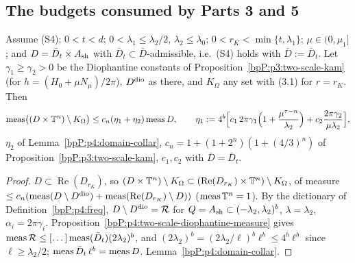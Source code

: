\subsection{The budgets consumed by Parts 3 and 5}\label{bpP:p4:s-budget}

\begin{proposition}\label{bpP:p4:budget}
Assume (S4); $0<t<d$; $0<\lambda_1\le\lambda_2/2$, $\lambda_2\le\lambda_0$; $0<r_K<\min\{t,\lambda_1\}$; $\mu\in(0,\mu_1]$; and $D=\bar D_t\times A_{\rm sh}$ with $\bar D_t\subset\bar D$-admissible, i.e.\ (S4) holds with $\bar D:=\bar D_t$. Let $\gamma_1\ge\gamma_2>0$ be the Diophantine constants of Proposition~\ref{bpP:p3:two-scale-kam} (for $h=(H_0+\mu N_\mu)/2\pi$), $D^{\rm dio}$ as there, and $K_\Omega$ any set with (3.1) for $r=r_K$. Then
\[\operatorname{meas}\bigl((D\times\mathbb{T}^n)\setminus K_\Omega\bigr)\le c_n(\eta_1+\eta_2)\operatorname{meas} D,\qquad
\eta_1:=4^b\Bigl[c_1\,2\pi\gamma_1\Bigl(1+\frac{\mu^{\tau-n}}{\lambda_2}\Bigr)+c_2\frac{2\pi\gamma_2}{\mu\lambda_2}\Bigr],\]
$\eta_2$ of Lemma~\ref{bpP:p4:domain-collar}, $c_n=1+(1+2^n)(1+(4/3)^n)$ of Proposition~\ref{bpP:p3:two-scale-kam}, $c_1,c_2$ with $\bar D=\bar D_t$.
\end{proposition}
\begin{proof}
\label{stepP:p4:bu-read}
$D\subset\operatorname{Re}(D_{r_K})$, so $(D\times\mathbb{T}^n)\setminus K_\Omega\subset(\operatorname{Re}(D_{r_K})\times\mathbb{T}^n)\setminus K_\Omega$, of measure $\le c_n(\operatorname{meas}(D\setminus D^{\rm dio})+\operatorname{meas}(\operatorname{Re}(D_{r_K})\setminus D))$ ($\operatorname{meas}\mathbb{T}^n=1$).
\label{stepP:p4:bu-dio}
By the dictionary of Definition~\ref{bpP:p4:freq}, $D\setminus D^{\rm dio}=\mathcal R$ for $Q=A_{\rm sh}\subset(-\lambda_2,\lambda_2)^b$, $\lambda=\lambda_2$, $\alpha_i=2\pi\gamma_i$. Proposition~\ref{bpP:p4:two-scale-diophantine-measure} gives $\operatorname{meas}\mathcal R\le[\dots]\operatorname{meas}(\bar D_t)(2\lambda_2)^b$, and $(2\lambda_2)^b=(2\lambda_2/\ell)^b\ell^b\le4^b\ell^b$ since $\ell\ge\lambda_2/2$; $\operatorname{meas}\bar D_t\,\ell^b=\operatorname{meas} D$.
\label{stepP:p4:bu-collar}
Lemma~\ref{bpP:p4:domain-collar}.
\end{proof}

